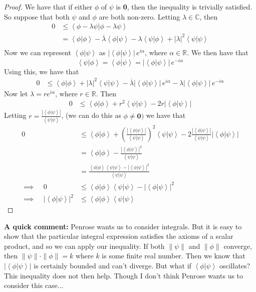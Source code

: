 \begin{proof}


We have that if either $\phi$ of $\psi$ is \textbf{0}, then the inequality is trivially satisfied. So suppose that both $\psi$ and $\phi$ are both non-zero. Letting $\lambda\in\mathbb{C}$, then
\begin{align*}
0&\leq\left<\phi-\lambda\psi|\phi-\lambda\psi\right>\\
&=\left<\phi|\phi\right>-\overline{\lambda}\left<\phi|\psi\right>-\lambda\left<\psi|\phi\right>+|\lambda|^2\left<\psi|\psi\right>\\
\end{align*}
Now we can represent $\left<\phi|\psi\right>$ as $|\left<\phi|\psi\right>|\,e^{i\alpha}$,
where $\alpha\in\mathbb{R}$. We then have that 
$$\left<\psi|\phi\right>=\overline{\left<\phi|\psi\right>}=|\left<\phi|\psi\right>|\,e^{-i\alpha}$$
Using this, we have that
\begin{align*}
0&\leq \left<\phi|\phi\right>+|\lambda|^2\left<\psi|\psi\right>-\overline{\lambda}|\left<\phi|\psi\right>|\,e^{i\alpha}-\lambda|\left<\phi|\psi\right>|\,e^{-i\alpha}
\end{align*}
Now let $\lambda=re^{i\alpha}$, where $r\in\mathbb{R}$. Then
\begin{align*}
0&\leq \left<\phi|\phi\right>+r^2\left<\psi|\psi\right>-2r|\left<\phi|\psi\right>|
\end{align*}
Letting $r=\frac{|\left<\phi|\psi\right>|}{\left<\psi|\psi\right>}$, (we can do this as $\phi\neq\mathbf{0})$  we have that
\begin{align*}
0&\leq \left<\phi|\phi\right>+\left(\frac{|\left<\phi|\psi\right>|}{\left<\psi|\psi\right>}\right)^2\left<\psi|\psi\right>-2\frac{|\left<\phi|\psi\right>|}{\left<\psi|\psi\right>}|\left<\phi|\psi\right>|\\
&=\left<\phi|\phi\right>-\frac{|\left<\phi|\psi\right>|^2}{\left<\psi|\psi\right>}\\
&=\frac{\left<\phi|\phi\right>\left<\psi|\psi\right>-|\left<\phi|\psi\right>|^2}{\left<\psi|\psi\right>}\\
\implies \ \ \ \ \ 0&\leq \left<\phi|\phi\right>\left<\psi|\psi\right>-|\left<\phi|\psi\right>|^2\\
\implies \ \ \ \ \ |\left<\phi|\psi\right>|^2&\leq \left<\phi|\phi\right>\left<\psi|\psi\right>
\end{align*}

\end{proof}
\textbf{A quick comment:} Penrose wants us to consider integrals. But it is easy to show that the particular integral expression satisfies the axioms of a scalar product, and so we can apply our inequality.  If both $\|\psi\|$ and $\|\phi\|$ converge, then $\|\psi\|\cdot\|\phi\|=k$ where $k$ is some finite real number. Then we know that $|\left <\phi|\psi\right>|$ is certainly bounded and can't diverge. But what if $\left <\phi|\psi\right>$ oscillates? This inequality does not then help. Though I don't think Penrose wants us to consider this case...


